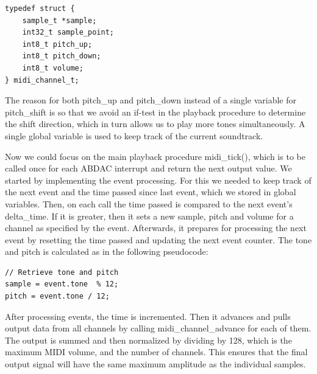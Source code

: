 \documentclass[a4paper,12pt]{article}
\begin{document}
\begin{verbatim}
typedef struct {
    sample_t *sample;
    int32_t sample_point;
    int8_t pitch_up;
    int8_t pitch_down;
    int8_t volume;
} midi_channel_t;
\end{verbatim}

The reason for both pitch\_up and pitch\_down instead of a single variable for pitch\_shift is so that we avoid an if-test in the playback procedure to determine the shift direction, which in turn allows us to play more tones simultaneously. A single global variable is used to keep track of the current soundtrack.

Now we could focus on the main playback procedure midi_tick(), which is to be called once for each ABDAC interrupt and return the next output value. We started by implementing the event processing. For this we needed to keep track of the next event and the time passed since last event, which we stored in global variables. Then, on each call the time passed is compared to the next event’s delta_time. If it is greater, then it sets a new sample, pitch and volume for a channel as specified by the event. Afterwards, it prepares for processing the next event by resetting the time passed and updating the next event counter. The tone and pitch is calculated as in the following pseudocode:

\begin{verbatim}
// Retrieve tone and pitch
sample = event.tone  % 12;
pitch = event.tone / 12;
\end{verbatim}

After processing events, the time is incremented. Then it advances and pulls output data from all channels by calling midi_channel_advance for each of them. The output is summed and then normalized by dividing by 128, which is the maximum MIDI volume, and the number of channels. This ensures that the final output signal will have the same maximum amplitude as the individual samples.
\end{document}
